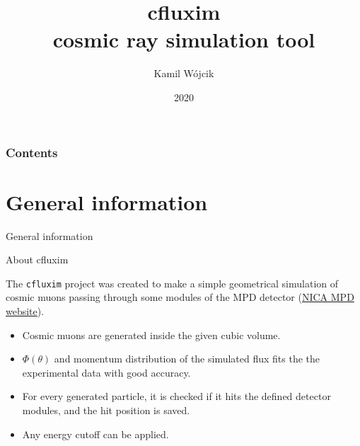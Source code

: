 \documentclass{beamer}
\title[cfluxim cosmic ray simulation tool]{cfluxim\\cosmic ray simulation tool}
\subtitle{}
\author[K. Wójcik]{Kamil Wójcik}
\institute[University of Silesia]{University of Silesia}
\date{2020}
\begin{document}
\begin{frame}
	\vfill
	\titlepage
	\vfill
\end{frame}


	\begin{frame}
		\frametitle{Contents}
		\tableofcontents
	\end{frame}


\section{General information}

\begin{frame}
\vfill
\centering
\Huge{General information}

\vfill
\end{frame}



\begin{frame}{About cfluxim}

The \texttt{cfluxim} project was created to make a simple geometrical simulation of cosmic muons passing through some modules of the MPD detector (\textcolor{blue}{\href{https://nica.jinr.ru/projects/mpd.php}{NICA MPD website}}).

\begin{itemize}
\item Cosmic muons are generated inside the given cubic volume.
\item $\Phi(\theta)$ and momentum distribution of the simulated flux fits the the experimental data with good accuracy.
\item For every generated particle, it is checked if it hits the defined detector modules, and the hit position is saved.
\item Any energy cutoff can be applied.
\end{itemize}

\end{frame}
\end{document}
